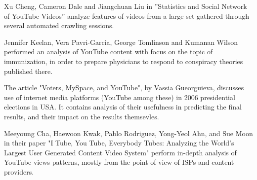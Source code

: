 Xu Cheng, Cameron Dale and Jiangchuan Liu in ''Statistics and Social Network of
YouTube Videos'' analyze features of videos from a large set gathered through
several automated crawling sessions.

Jennifer Keelan, Vera Pavri-Garcia, George Tomlinson and Kumanan Wilson
performed an analysis of YouTube content with focus on the topic of
immunization, in order to prepare physicians to respond to conspiracy theories
published there.

The article "Voters, MySpace, and YouTube", by Vassia Gueorguieva, discusses use
of internet media platforms (YouTube among these) in 2006 presidential elections
in USA. It contains analysis of their usefulness in predicting the final
results, and their impact on the results themsevles.

Meeyoung Cha, Haewoon Kwak, Pablo Rodriguez, Yong-Yeol Ahn, and Sue Moon in
their paper "I Tube, You Tube, Everybody Tubes: Analyzing the World’s Largest
User Generated Content Video System" perform in-depth analysis of YouTube views
patterns, mostly from the point of view of ISPs and content providers.


